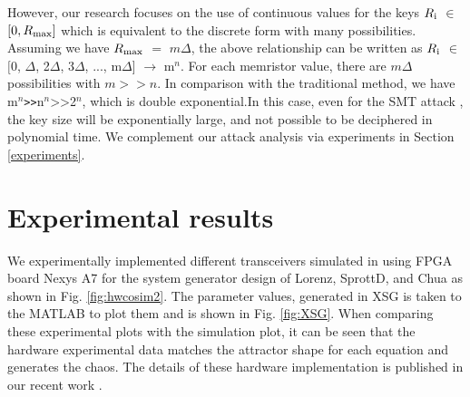 However, our research focuses on the use of continuous values for the keys $R\textsubscript{i}$ $\in$ $[0, R\textsubscript{max}]$ which is equivalent to the discrete form with many possibilities. Assuming we have $R\textsubscript{max}$ $=$ $m\Delta$, the above relationship can be written as $R\textsubscript{i}$ $\in$ $[0$, $\Delta$, 2$\Delta$, 3$\Delta$, ..., m$\Delta$] $\rightarrow$ m$^n$. For each memristor value, there are $m\Delta$ possibilities with $m >> n$. In comparison with the traditional method, we have m$^n$\texttt{>>}n$^n$$\texttt{>>}$2$^n$, which is double exponential.In this case, even for the SMT attack \cite{9000113}, the key size will be exponentially large, and not possible to be deciphered in polynomial time. We complement our attack analysis via experiments in Section \ref{experiments}.

\section*{Experimental results} \label{experiments}
We experimentally implemented different transceivers simulated in \cite{hedayatipour2021comprehensive} using FPGA board Nexys A7 for the system generator design of Lorenz, SprottD, and Chua as shown in Fig. \ref{fig:hwcosim2}. The parameter values, generated in XSG is taken to the MATLAB to plot them and is shown in Fig. \ref{fig:XSG}. When comparing these experimental plots with the simulation plot, it can be seen that the hardware experimental data matches the attractor shape for each equation and generates the chaos. The details of these hardware implementation is published in our recent work \cite{monani2022implementation}.

